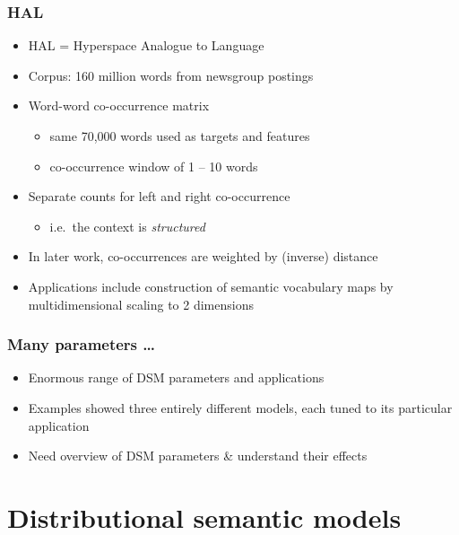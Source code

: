 \documentclass[t]{beamer} %
\begin{document}
\begin{frame}
  \frametitle{HAL \citep{Lund:Burgess:96}}

  \begin{itemize}
  \item HAL = Hyperspace Analogue to Language
  \item Corpus: 160 million words from newsgroup postings
  \item Word-word co-occurrence matrix
    \begin{itemize}
    \item same 70,000 words used as targets and features
    \item co-occurrence window of 1 -- 10 words
    \end{itemize}
  \item Separate counts for left and right co-occurrence
    \begin{itemize}
    \item i.e.\ the context is \emph{structured}
    \end{itemize}
  \item In later work, co-occurrences are weighted by (inverse) distance \citep{Li:Burgess:Lund:00}
  \item Applications include construction of semantic vocabulary maps
    by multidimensional scaling to 2 dimensions
  \end{itemize}
\end{frame}

\begin{frame}
  \frametitle{Many parameters \ldots}

  \begin{itemize}
  \item Enormous range of DSM parameters and applications
  \item Examples showed three entirely different models, each tuned to
    its particular application
  \item[\So] Need overview of DSM parameters \& understand their effects
  \end{itemize}
\end{frame}

\section{Distributional semantic models}

\end{document}
